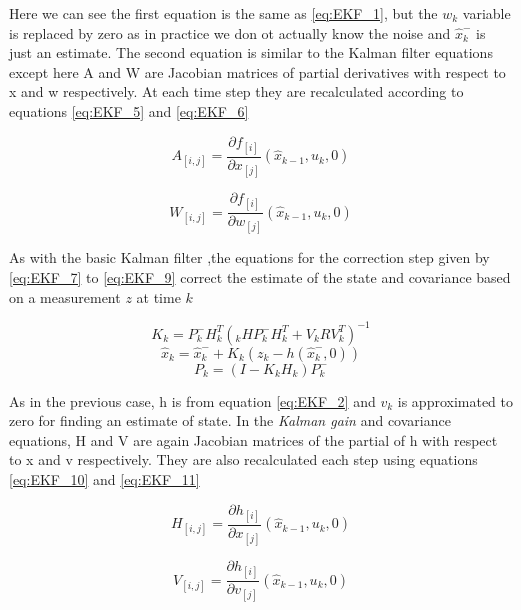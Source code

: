 Here we can see the first equation is the same as \ref{eq:EKF_1}, but the $ w_k $ variable is replaced by zero as in practice we don ot actually know the noise and $ \hat{x}^-_k $ is just an estimate. The second equation is similar to the Kalman filter equations except here A and W are Jacobian matrices of partial derivatives with respect to x and w respectively. At each time step they are recalculated according to equations \ref{eq:EKF_5} and \ref{eq:EKF_6}

\begin{equation}
\label{eq:EKF_5}
A_{[i,j]} = \frac{\partial f_{[i]}}{\partial x_{[j]}} (\hat{x}_{k-1},u_k,0)
\end{equation}

\begin{equation}
\label{eq:EKF_6}
W_{[i,j]} = \frac{\partial f_{[i]}}{\partial w_{[j]}} (\hat{x}_{k-1},u_k,0)
\end{equation}

As with the basic Kalman filter ,the equations for the correction step given by \ref{eq:EKF_7} to \ref{eq:EKF_9} correct the estimate of the state and covariance based on a measurement $ z $ at time $ k $

\begin{equation}
\label{eq:EKF_7}
K_k = P^-_kH^T_k(_kHP^-_kH^T_k+V_kRV^T_k)^{-1}
\end{equation}
\begin{equation}
\label{eq:EKF_8}
\hat{x}_k = \hat{x}^-_k+K_k(z_k-h(\hat{x}^-_k,0))
\end{equation}
\begin{equation}
\label{eq:EKF_9}
P_k = (I-K_kH_k)P^-_k
\end{equation} 

As in the previous case, h is from equation \ref{eq:EKF_2} and $ v_k $ is approximated to zero for finding an estimate of state. In the \textit{Kalman gain} and covariance equations, H and V are again Jacobian matrices of the partial of h with respect to x and v respectively. They are also recalculated each step using equations \ref{eq:EKF_10} and \ref{eq:EKF_11}

\begin{equation}
\label{eq:EKF_10}
H_{[i,j]} = \frac{\partial h_{[i]}}{\partial x_{[j]}} (\hat{x}_{k-1},u_k,0)
\end{equation}

\begin{equation}
\label{eq:EKF_11}
V_{[i,j]} = \frac{\partial h_{[i]}}{\partial v_{[j]}} (\hat{x}_{k-1},u_k,0)
\end{equation}

